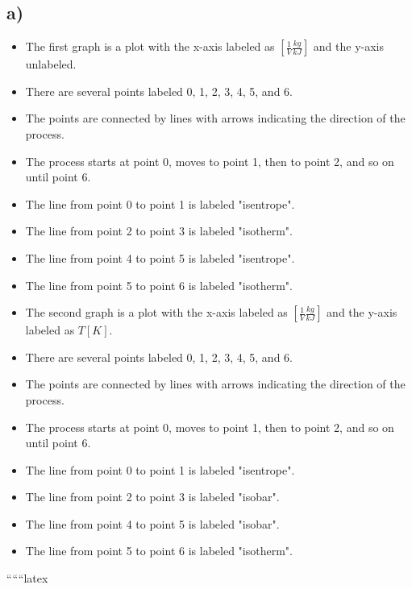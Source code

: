 

\subsection*{a)}

\begin{itemize}
    \item The first graph is a plot with the x-axis labeled as $[ \frac{1}{V} \frac{kg}{kJ} ]$ and the y-axis unlabeled.
    \item There are several points labeled 0, 1, 2, 3, 4, 5, and 6.
    \item The points are connected by lines with arrows indicating the direction of the process.
    \item The process starts at point 0, moves to point 1, then to point 2, and so on until point 6.
    \item The line from point 0 to point 1 is labeled "isentrope".
    \item The line from point 2 to point 3 is labeled "isotherm".
    \item The line from point 4 to point 5 is labeled "isentrope".
    \item The line from point 5 to point 6 is labeled "isotherm".
\end{itemize}

\begin{itemize}
    \item The second graph is a plot with the x-axis labeled as $[ \frac{1}{V} \frac{kg}{kJ} ]$ and the y-axis labeled as $T [K]$.
    \item There are several points labeled 0, 1, 2, 3, 4, 5, and 6.
    \item The points are connected by lines with arrows indicating the direction of the process.
    \item The process starts at point 0, moves to point 1, then to point 2, and so on until point 6.
    \item The line from point 0 to point 1 is labeled "isentrope".
    \item The line from point 2 to point 3 is labeled "isobar".
    \item The line from point 4 to point 5 is labeled "isobar".
    \item The line from point 5 to point 6 is labeled "isotherm".
\end{itemize}

``````latex
